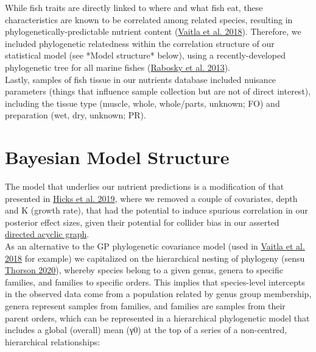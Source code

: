 \documentclass{article}
\begin{document}
While fish traits are directly linked to where and what fish eat, these characteristics are known to be correlated among related species, resulting in phylogenetically-predictable nutrient content (\href{https://www.nature.com/articles/s41467-018-06199-w}{Vaitla et al. 2018}). Therefore, we  included phylogenetic relatedness within the correlation structure of our statistical model (see *Model structure* below), using a recently-developed phylogenetic tree for all marine fishes (\href{https://www.nature.com/articles/ncomms2958}{Rabosky et al. 2013}). \\

Lastly, samples of fish tissue in our nutrients database included nuisance parameters (things that influence sample collection but are not of direct interest), including the tissue type (muscle, whole, whole/parts, unknown; FO) and preparation (wet, dry, unknown; PR). 


\section{Bayesian Model Structure}


The model that underlies our nutrient predictions is a modification of that presented in \href{https://www.nature.com/articles/s41586-019-1592-6}{Hicks et al. 2019}, where we removed a couple of covariates, depth and K (growth rate), that had the potential to induce spurious correlation in our posterior effect sizes, given their potential for collider bias in our asserted \href{https://github.com/mamacneil/NutrientFishbase/blob/master/model/nutrients\_DAG.jpg}{directed acyclic graph}.\\

As an alternative to the GP phylogenetic covariance model (used in \href{https://www.nature.com/articles/s41467-018-06199-w}{Vaitla et al. 2018} for example) we capitalized on the hierarchical nesting of phylogeny (sensu \href{https://onlinelibrary.wiley.com/doi/abs/10.1111/faf.12427}{Thorson 2020}), whereby species belong to a given genus, genera to specific families, and families to specific orders. This implies that species-level intercepts in the observed data come from a population related by genus group membership, genera represent samples from families, and families are samples from their parent orders, which can be represented in a hierarchical phylogenetic model that includes a global (overall) mean (γ0) at the top of a series of a non-centred, hierarchical relationships:
\end{document}
